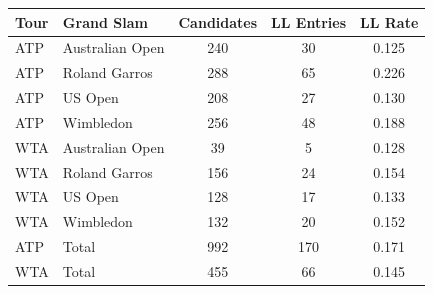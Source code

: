 \begin{tabular}{llccc}
\toprule
Tour & Grand Slam & Candidates & LL Entries & LL Rate \\
\midrule
ATP & Australian Open & 240 & 30 & 0.125 \\
ATP & Roland Garros & 288 & 65 & 0.226 \\
ATP & US Open & 208 & 27 & 0.130 \\
ATP & Wimbledon & 256 & 48 & 0.188 \\
WTA & Australian Open & 39 & 5 & 0.128 \\
WTA & Roland Garros & 156 & 24 & 0.154 \\
WTA & US Open & 128 & 17 & 0.133 \\
WTA & Wimbledon & 132 & 20 & 0.152 \\
\midrule
ATP & Total & 992 & 170 & 0.171 \\
WTA & Total & 455 & 66 & 0.145 \\
\bottomrule
\end{tabular}
